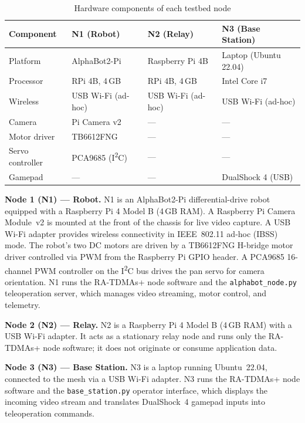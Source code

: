 \begin{table}[h]
\centering
\caption{Hardware components of each testbed node}
\label{tab:hardware}
\begin{tabular}{llll}
\toprule
\textbf{Component} & \textbf{N1 (Robot)} & \textbf{N2 (Relay)} & \textbf{N3 (Base Station)} \\
\midrule
Platform        & AlphaBot2-Pi    & Raspberry Pi 4B & Laptop (Ubuntu 22.04) \\
Processor       & RPi 4B, 4\,GB   & RPi 4B, 4\,GB   & Intel Core i7 \\
Wireless        & USB Wi-Fi (ad-hoc) & USB Wi-Fi (ad-hoc) & USB Wi-Fi (ad-hoc) \\
Camera          & Pi Camera v2    & ---             & --- \\
Motor driver    & TB6612FNG       & ---             & --- \\
Servo controller & PCA9685 (I\textsuperscript{2}C) & --- & --- \\
Gamepad         & ---             & ---             & DualShock 4 (USB) \\
\bottomrule
\end{tabular}
\end{table}

\textbf{Node 1 (N1) --- Robot.} N1 is an AlphaBot2-Pi differential-drive
robot equipped with a Raspberry Pi 4 Model B (4\,GB RAM). A Raspberry Pi
Camera Module~v2 is mounted at the front of the chassis for live video
capture. A USB Wi-Fi adapter provides wireless connectivity in IEEE~802.11
ad-hoc (IBSS) mode. The robot's two DC motors are driven by a TB6612FNG
H-bridge motor driver controlled via PWM from the Raspberry Pi GPIO header.
A PCA9685 16-channel PWM controller on the I\textsuperscript{2}C bus drives
the pan servo for camera orientation. N1 runs the RA-TDMAs+ node software
and the \texttt{alphabot\_node.py} teleoperation server, which manages video
streaming, motor control, and telemetry.

\textbf{Node 2 (N2) --- Relay.} N2 is a Raspberry Pi 4 Model B (4\,GB RAM)
with a USB Wi-Fi adapter. It acts as a stationary relay node and runs only
the RA-TDMAs+ node software; it does not originate or consume application
data.

\textbf{Node 3 (N3) --- Base Station.} N3 is a laptop running Ubuntu~22.04,
connected to the mesh via a USB Wi-Fi adapter. N3 runs the RA-TDMAs+ node
software and the \texttt{base\_station.py} operator interface, which displays
the incoming video stream and translates DualShock~4 gamepad inputs into
teleoperation commands.

